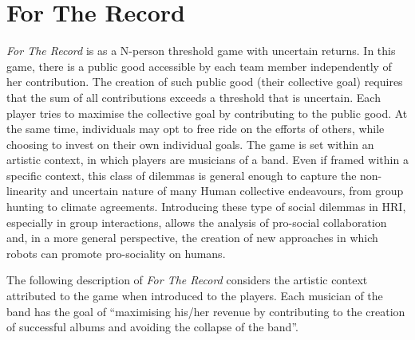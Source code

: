 \section{For The Record}
\label{sec:for-the-record}
\textit{For The Record} is as a N-person threshold game with uncertain returns. In this game, there is a public good accessible by each team member independently of her contribution. The creation of such public good (their collective goal) requires that the sum of all contributions exceeds a threshold that is uncertain. Each player tries to maximise the collective goal by contributing to the public good. At the same time, individuals may opt to free ride on the efforts of others, while choosing to invest on their own individual goals. The game is set within an artistic context, in which players are musicians of a band. Even if framed within a specific context, this class of dilemmas is general enough to capture the non-linearity and uncertain nature of many Human collective endeavours, from group hunting to climate agreements. Introducing these type of social dilemmas in HRI, especially in group interactions, allows the analysis of pro-social collaboration and, in a more general perspective, the creation of new approaches in which robots can promote pro-sociality on humans.

The following description of \textit{For The Record} considers the artistic context attributed to the game when introduced to the players. Each musician of the band has the goal of ``maximising his/her revenue by contributing to the creation of successful albums and avoiding the collapse of the band''.

